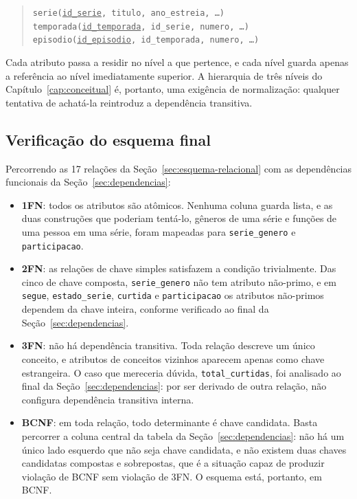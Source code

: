 \documentclass[a4paper,12pt,oneside,openany]{book}
\newcommand{\id}[1]{\texttt{#1}}
\begin{document}
\begin{quote}
\id{serie(\underline{id\_serie}, titulo, ano\_estreia, \dots)}\\
\id{temporada(\underline{id\_temporada}, id\_serie, numero, \dots)}\\
\id{episodio(\underline{id\_episodio}, id\_temporada, numero, \dots)}
\end{quote}

Cada atributo passa a residir no nível a que pertence, e cada nível guarda apenas a
referência ao nível imediatamente superior. A hierarquia de três níveis do
Capítulo~\ref{cap:conceitual} é, portanto, uma exigência de normalização: qualquer
tentativa de achatá-la reintroduz a dependência transitiva.

\subsection{Verificação do esquema final}

Percorrendo as 17 relações da Seção~\ref{sec:esquema-relacional} com as dependências
funcionais da Seção~\ref{sec:dependencias}:

\begin{itemize}[nosep]
    \item \textbf{1FN}: todos os atributos são atômicos. Nenhuma coluna guarda
lista, e as duas construções que poderiam tentá-lo, gêneros de uma série e funções
de uma pessoa em uma série, foram mapeadas para \id{serie\_genero} e
\id{participacao}.
    \item \textbf{2FN}: as relações de chave simples satisfazem a condição
    trivialmente. Das cinco de chave composta, \id{serie\_genero} não tem atributo
    não-primo, e em \id{segue}, \id{estado\_serie}, \id{curtida} e
    \id{participacao} os atributos não-primos dependem da chave inteira, conforme
    verificado ao final da Seção~\ref{sec:dependencias}.
    \item \textbf{3FN}: não há dependência transitiva. Toda relação descreve um
    único conceito, e atributos de conceitos vizinhos aparecem apenas como chave
    estrangeira. O caso que mereceria dúvida, \id{total\_curtidas}, foi analisado ao
    final da Seção~\ref{sec:dependencias}: por ser derivado de outra relação, não
    configura dependência transitiva interna.
    \item \textbf{BCNF}: em toda relação, todo determinante é chave candidata.
    Basta percorrer a coluna central da tabela da Seção~\ref{sec:dependencias}: não
    há um único lado esquerdo que não seja chave candidata, e não existem duas
chaves candidatas compostas e sobrepostas, que é a situação capaz de produzir
violação de BCNF sem violação de 3FN. O esquema está, portanto, em BCNF.
\end{itemize}
\end{document}
